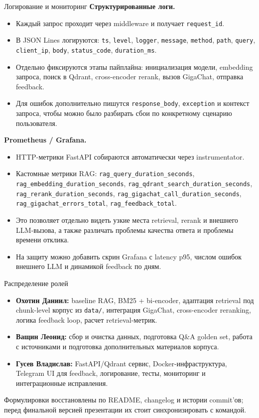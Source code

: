 \documentclass[aspectratio=169,11pt]{beamer}
\begin{document}
\begin{frame}{Логирование и мониторинг}
  \small
  \textbf{Структурированные логи.}
  \begin{itemize}
    \item Каждый запрос проходит через middleware и получает \texttt{request\_id}.
    \item В JSON Lines логируются: \texttt{ts}, \texttt{level}, \texttt{logger}, \texttt{message}, \texttt{method}, \texttt{path}, \texttt{query}, \texttt{client\_ip}, \texttt{body}, \texttt{status\_code}, \texttt{duration\_ms}.
    \item Отдельно фиксируются этапы пайплайна: инициализация модели, embedding запроса, поиск в Qdrant, cross-encoder rerank, вызов GigaChat, отправка feedback.
    \item Для ошибок дополнительно пишутся \texttt{response\_body}, \texttt{exception} и контекст запроса, чтобы можно было разбирать сбои по конкретному сценарию пользователя.
  \end{itemize}

  \textbf{Prometheus / Grafana.}
  \begin{itemize}
    \item HTTP-метрики FastAPI собираются автоматически через instrumentator.
    \item Кастомные метрики RAG: \texttt{rag\_query\_duration\_seconds}, \texttt{rag\_embedding\_duration\_seconds}, \texttt{rag\_qdrant\_search\_duration\_seconds}, \texttt{rag\_rerank\_duration\_seconds}, \texttt{rag\_gigachat\_call\_duration\_seconds}, \texttt{rag\_gigachat\_errors\_total}, \texttt{rag\_feedback\_total}.
    \item Это позволяет отдельно видеть узкие места retrieval, rerank и внешнего LLM-вызова, а также различать проблемы качества ответа и проблемы времени отклика.
    \item На защиту можно добавить скрин Grafana с latency p95, числом ошибок внешнего LLM и динамикой feedback по дням.
  \end{itemize}
\end{frame}

\begin{frame}{Распределение ролей}
  \small
  \begin{itemize}
    \item \textbf{Охотин Даниил:} baseline RAG, BM25 + bi-encoder, адаптация retrieval под chunk-level корпус из \texttt{data/}, интеграция GigaChat, cross-encoder reranking, логика feedback loop, расчет retrieval-метрик.
    \item \textbf{Ващин Леонид:} сбор и очистка данных, подготовка Q\&A golden set, работа с источниками и подготовка дополнительных материалов корпуса.
    \item \textbf{Гусев Владислав:} FastAPI/Qdrant сервис, Docker-инфраструктура, Telegram UI для feedback, логирование, тесты, мониторинг и интеграционные исправления.
  \end{itemize}

  \vspace{0.3em}
  \footnotesize
  Формулировки восстановлены по README, changelog и истории commit'ов; перед финальной версией презентации их стоит синхронизировать с командой.
\end{frame}
\end{document}

